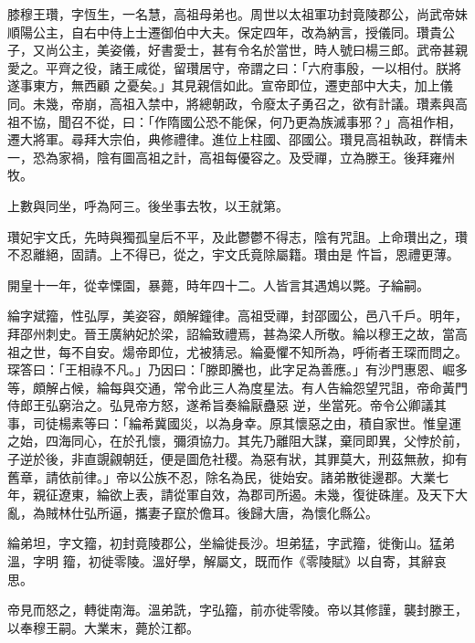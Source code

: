
\begin{pinyinscope}

 膝穆王瓚，字恆生，一名慧，高祖母弟也。周世以太祖軍功封竟陵郡公，尚武帝妹順陽公主，自右中侍上士遷御伯中大夫。保定四年，改為納言，授儀同。瓚貴公子，又尚公主，美姿儀，好書愛士，甚有令名於當世，時人號曰楊三郎。武帝甚親愛之。平齊之役，諸王咸從，留瓚居守，帝謂之曰：「六府事殷，一以相付。朕將遂事東方，無西顧
 之憂矣。」其見親信如此。宣帝即位，遷吏部中大夫，加上儀同。未幾，帝崩，高祖入禁中，將總朝政，令廢太子勇召之，欲有計議。瓚素與高祖不協，聞召不從，曰：「作隋國公恐不能保，何乃更為族滅事邪？」高祖作相，遷大將軍。尋拜大宗伯，典修禮律。進位上柱國、邵國公。瓚見高祖執政，群情未一，恐為家禍，陰有圖高祖之計，高祖每優容之。及受禪，立為滕王。後拜雍州牧。



 上數與同坐，呼為阿三。後坐事去牧，以王就第。



 瓚妃宇文氏，先時與獨孤皇后不平，及此鬱鬱不得志，陰有咒詛。上命瓚出之，瓚不忍離絕，固請。上不得已，從之，宇文氏竟除屬籍。瓚由是
 忤旨，恩禮更薄。



 開皇十一年，從幸慄園，暴薨，時年四十二。人皆言其遇鴆以斃。子綸嗣。



 綸字斌籀，性弘厚，美姿容，頗解鐘律。高祖受禪，封邵國公，邑八千戶。明年，拜邵州刺史。晉王廣納妃於梁，詔綸致禮焉，甚為梁人所敬。綸以穆王之故，當高祖之世，每不自安。煬帝即位，尤被猜忌。綸憂懼不知所為，呼術者王琛而問之。琛答曰：「王相祿不凡。」乃因曰：「滕即騰也，此字足為善應。」有沙門惠恩、崛多等，頗解占候，綸每與交通，常令此三人為度星法。有人告綸怨望咒詛，帝命黃門侍郎王弘窮治之。弘見帝方怒，遂希旨奏綸厭蠱惡
 逆，坐當死。帝令公卿議其事，司徒楊素等曰：「綸希冀國災，以為身幸。原其懷惡之由，積自家世。惟皇運之始，四海同心，在於孔懷，彌須協力。其先乃離阻大謀，棄同即異，父悖於前，子逆於後，非直覬覦朝廷，便是圖危社稷。為惡有狀，其罪莫大，刑茲無赦，抑有舊章，請依前律。」帝以公族不忍，除名為民，徙始安。諸弟散徙邊郡。大業七年，親征遼東，綸欲上表，請從軍自效，為郡司所遏。未幾，復徙硃崖。及天下大亂，為賊林仕弘所逼，攜妻子竄於儋耳。後歸大唐，為懷化縣公。



 綸弟坦，字文籀，初封竟陵郡公，坐綸徙長沙。坦弟猛，字武籀，徙衡山。猛弟溫，字明
 籀，初徙零陵。溫好學，解屬文，既而作《零陵賦》以自寄，其辭哀思。



 帝見而怒之，轉徙南海。溫弟詵，字弘籀，前亦徙零陵。帝以其修謹，襲封滕王，以奉穆王嗣。大業末，薨於江都。




\end{pinyinscope}
